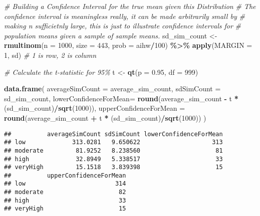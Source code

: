\documentclass[
]{article}
\newenvironment{Shaded}{\begin{snugshade}}{\end{snugshade}}
\newcommand{\CommentTok}[1]{\textcolor[rgb]{0.56,0.35,0.01}{\textit{#1}}}
\newcommand{\DataTypeTok}[1]{\textcolor[rgb]{0.13,0.29,0.53}{#1}}
\newcommand{\DecValTok}[1]{\textcolor[rgb]{0.00,0.00,0.81}{#1}}
\newcommand{\FloatTok}[1]{\textcolor[rgb]{0.00,0.00,0.81}{#1}}
\newcommand{\KeywordTok}[1]{\textcolor[rgb]{0.13,0.29,0.53}{\textbf{#1}}}
\newcommand{\NormalTok}[1]{#1}
\newcommand{\OperatorTok}[1]{\textcolor[rgb]{0.81,0.36,0.00}{\textbf{#1}}}
\newcommand{\StringTok}[1]{\textcolor[rgb]{0.31,0.60,0.02}{#1}}
\begin{document}
\begin{Shaded}
\begin{Highlighting}[]
\CommentTok{\# Building a Confidence Interval for the true mean given this Distribution}
\CommentTok{\# The confidence interval is meaningless really, it can be made arbitrarily small by}
\CommentTok{\# making n sufficietnly large, this is just to illustrate confidence intervals for}
\CommentTok{\# population means given a sample of sample means.}
\NormalTok{sd\_sim\_count      <{-}}\StringTok{ }\KeywordTok{rmultinom}\NormalTok{(}\DataTypeTok{n =} \DecValTok{1000}\NormalTok{, }\DataTypeTok{size =} \DecValTok{443}\NormalTok{, }\DataTypeTok{prob =}\NormalTok{ aihw}\OperatorTok{/}\DecValTok{100}\NormalTok{) }\OperatorTok{\%>\%}\StringTok{ }\KeywordTok{apply}\NormalTok{(}\DataTypeTok{MARGIN =} \DecValTok{1}\NormalTok{, sd) }\CommentTok{\# 1 is row, 2 is column}

\CommentTok{\# Calculate the t{-}statistic for 95\%}
\NormalTok{t <{-}}\StringTok{ }\KeywordTok{qt}\NormalTok{(}\DataTypeTok{p =} \FloatTok{0.95}\NormalTok{, }\DataTypeTok{df =} \DecValTok{999}\NormalTok{)}

\KeywordTok{data.frame}\NormalTok{(}
  \DataTypeTok{averageSimCount =}\NormalTok{ average\_sim\_count,}
  \DataTypeTok{sdSimCount =}\NormalTok{ sd\_sim\_count,}
  \DataTypeTok{lowerConfidenceForMean=} \KeywordTok{round}\NormalTok{(average\_sim\_count }\OperatorTok{{-}}\StringTok{ }\NormalTok{t }\OperatorTok{*}\StringTok{ }\NormalTok{(sd\_sim\_count)}\OperatorTok{/}\KeywordTok{sqrt}\NormalTok{(}\DecValTok{1000}\NormalTok{)),}
  \DataTypeTok{upperConfidenceForMean =} \KeywordTok{round}\NormalTok{(average\_sim\_count }\OperatorTok{+}\StringTok{ }\NormalTok{t }\OperatorTok{*}\StringTok{ }\NormalTok{(sd\_sim\_count)}\OperatorTok{/}\KeywordTok{sqrt}\NormalTok{(}\DecValTok{1000}\NormalTok{))}
\NormalTok{)}
\end{Highlighting}
\end{Shaded}

\begin{verbatim}
##          averageSimCount sdSimCount lowerConfidenceForMean
## low             313.0281   9.650622                    313
## moderate         81.9252   8.238560                     81
## high             32.8949   5.338517                     33
## veryHigh         15.1518   3.839398                     15
##          upperConfidenceForMean
## low                         314
## moderate                     82
## high                         33
## veryHigh                     15
\end{verbatim}
\end{document}
